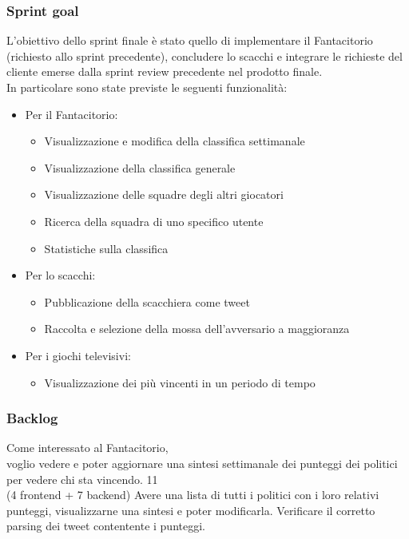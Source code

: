 \subsubsection{Sprint goal}
L'obiettivo dello sprint finale è stato quello di implementare il Fantacitorio (richiesto allo sprint precedente), concludere lo scacchi e 
integrare le richieste del cliente emerse dalla sprint review precedente nel prodotto finale.\\
In particolare sono state previste le seguenti funzionalità:
\begin{itemize}
    \item Per il Fantacitorio:
    \begin{itemize}
        \item Visualizzazione e modifica della classifica settimanale
        \item Visualizzazione della classifica generale
        \item Visualizzazione delle squadre degli altri giocatori
        \item Ricerca della squadra di uno specifico utente
        \item Statistiche sulla classifica
    \end{itemize}
    \item Per lo scacchi:
    \begin{itemize}
        \item Pubblicazione della scacchiera come tweet
        \item Raccolta e selezione della mossa dell'avversario a maggioranza
    \end{itemize}
    \item Per i giochi televisivi:
    \begin{itemize}
        \item Visualizzazione dei più vincenti in un periodo di tempo
    \end{itemize}
\end{itemize}


\subsubsection{Backlog}
\userstory%
{Come interessato al Fantacitorio,\\voglio vedere e poter aggiornare una sintesi settimanale dei punteggi dei politici\\per vedere chi sta vincendo.}%
{11\\(4 frontend + 7 backend)}%
{Avere una lista di tutti i politici con i loro relativi punteggi, visualizzarne una sintesi e poter modificarla.}%
{Verificare il corretto parsing dei tweet contentente i punteggi.}

